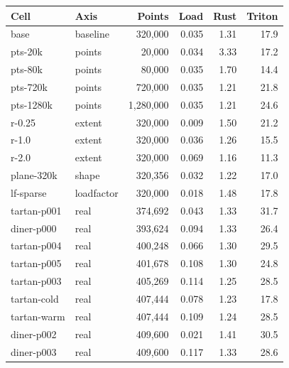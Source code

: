 \begin{tabular}{llrrrr}
\toprule
Cell & Axis & Points & Load & Rust & Triton \\
\midrule
base & baseline & 320,000 & 0.035 & 1.31 & 17.9 \\
\addlinespace
pts-20k & points & 20,000 & 0.034 & 3.33 & 17.2 \\
pts-80k & points & 80,000 & 0.035 & 1.70 & 14.4 \\
pts-720k & points & 720,000 & 0.035 & 1.21 & 21.8 \\
pts-1280k & points & 1,280,000 & 0.035 & 1.21 & 24.6 \\
\addlinespace
r-0.25 & extent & 320,000 & 0.009 & 1.50 & 21.2 \\
r-1.0 & extent & 320,000 & 0.036 & 1.26 & 15.5 \\
r-2.0 & extent & 320,000 & 0.069 & 1.16 & 11.3 \\
\addlinespace
plane-320k & shape & 320,356 & 0.032 & 1.22 & 17.0 \\
\addlinespace
lf-sparse & loadfactor & 320,000 & 0.018 & 1.48 & 17.8 \\
\addlinespace
tartan-p001 & real & 374,692 & 0.043 & 1.33 & 31.7 \\
diner-p000 & real & 393,624 & 0.094 & 1.33 & 26.4 \\
tartan-p004 & real & 400,248 & 0.066 & 1.30 & 29.5 \\
tartan-p005 & real & 401,678 & 0.108 & 1.30 & 24.8 \\
tartan-p003 & real & 405,269 & 0.114 & 1.25 & 28.5 \\
tartan-cold & real & 407,444 & 0.078 & 1.23 & 17.8 \\
tartan-warm & real & 407,444 & 0.109 & 1.24 & 28.5 \\
diner-p002 & real & 409,600 & 0.021 & 1.41 & 30.5 \\
diner-p003 & real & 409,600 & 0.117 & 1.33 & 28.6 \\
\bottomrule
\end{tabular}
